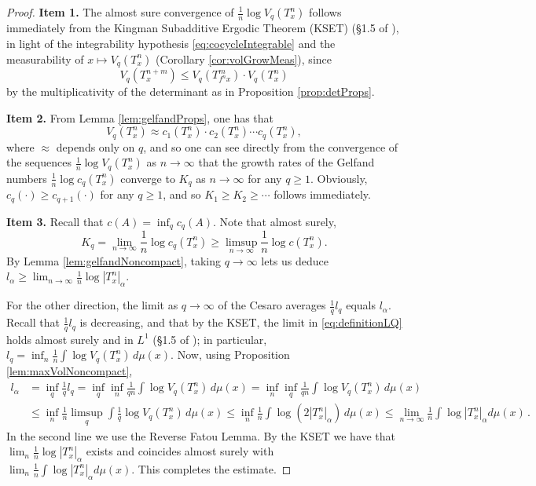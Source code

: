 \documentclass[11pt]{amsart}
\theoremstyle{theorem}
\theoremstyle{definition}
\numberwithin{equation}{section}
\renewcommand{\a}{\alpha}
\begin{document}
\begin{proof}
{\bf Item 1.} The almost sure convergence of $\frac{1}{n} \log V_q(T^n_x)$ follows immediately from the Kingman Subadditive Ergodic Theorem (KSET) (\S 1.5 of \cite{Kr}), in light of the integrability hypothesis \eqref{eq:cocycleIntegrable} and the measurability of $x \mapsto V_q(T^n_x)$ (Corollary \ref{cor:volGrowMeas}), since
\[
V_q(T^{n + m}_x) \leq V_q(T^m_{f^n x}) \cdot V_q(T^n_x) 
\] 
by the multiplicativity of the determinant as in Proposition \ref{prop:detProps}. 

{\bf Item 2.} From Lemma \ref{lem:gelfandProps}, one has that
\[V_q(T^n_x) \approx c_1(T^n_x) \cdot c_2(T^n_x) \cdots c_q(T^n_x),\]
where $\approx$ depends only on $q$, and so one can see directly from the convergence of the sequences $\frac{1}{n} \log V_q(T^n_x)$ as $n \to \infty$ that the growth rates of the Gelfand numbers $\frac{1}{n} \log c_q(T^n_x)$ converge to $K_q$ as $n \to \infty$ for any $q \geq 1$. Obviously, $c_{q}(\cdot) \geq c_{q + 1}(\cdot)$ for any $q \geq 1$, and so $K_1 \geq K_2 \geq \cdots$ follows immediately.

{\bf Item 3.} Recall that $c(A) = \inf_q c_q(A)$. Note that almost surely,
\[
K_q = \lim_{n \to \infty} \frac{1}{n} \log c_q(T^n_x) \geq \limsup_{n \to \infty} \frac{1}{n} \log c(T^n_x).
\]
By Lemma \ref{lem:gelfandNoncompact}, taking $q \to \infty$ lets us deduce $l_{\a} \geq \lim_{n \to \infty} \frac{1}{n} \log |T^n_x|_{\a}$.

For the other direction, the limit as $q \to \infty$ of the Cesaro averages $\frac{1}{q} l_q$ equals $l_{\a}$. Recall that $\frac{1}{q} l_q$ is decreasing, and that by the KSET, the limit in \eqref{eq:definitionLQ} holds almost surely and in $L^1$ (\S 1.5 of \cite{Kr}); in particular, $l_q = \inf_n \frac1n \int \log V_q(T^n_x) \, d \mu(x)$. Now, using Proposition \ref{lem:maxVolNoncompact},
\begin{align*}
l_{\a} &= \inf_q \frac{1}{q} l_q = \inf_q \inf_n \frac{1}{q n} \int \log V_q(T^n_x) \, d \mu(x) = \inf_n \inf_q \frac{1}{qn } \int \log V_q(T^n_x) \, d \mu(x)\\
& \leq \inf_n \frac{1}{n} \limsup_q  \int \frac{1}{q} \log V_q(T^n_x) \, d \mu(x) \leq \inf_n \frac{1}{n} \int \log (2 |T^n_x|_{\a}) \, d \mu(x) \leq \lim_{n \to \infty} \frac{1}{n} \int \log |T^n_x|_{\a} d \mu(x) \, .
\end{align*}
In the second line we use the Reverse Fatou Lemma. By the KSET we have that $\lim_n \frac{1}{n}  \log |T^n_x|_{\a}$ exists and coincides almost surely with $\lim_n \frac{1}{n} \int \log |T^n_x|_{\a} d \mu(x)$. This completes the estimate.
\end{proof}
\end{document}
